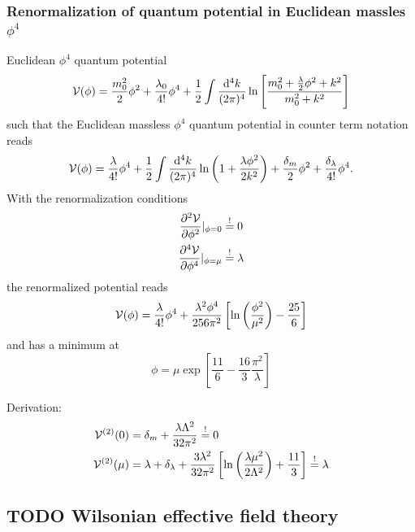 \subsubsection{Renormalization of quantum potential in Euclidean massles $\phi^4$}
\begin{mybox}{}
	Euclidean $\phi^4$ quantum potential
	\begin{equation}
		\mathcal{V}(\phi)=\frac{m^2_0}{2} \phi^2 +\frac{\lambda_0}{4!} \phi^4 + \frac{1}{2} \int \frac{\mathrm{d}^4 k}{(2 \pi)^4} \ln \left[\frac{m^2_0+\frac{\lambda}{2} \phi^2+k^2}{m^2_0+k^2}\right]
	\end{equation}
	such that the Euclidean massless $\phi^4$ quantum potential in counter term notation reads
	\begin{equation}
		\mathcal{V}(\phi) = \frac{\lambda}{4!}\phi^4 + \frac{1}{2} \int \frac{\mathrm{d}^4 k}{(2 \pi)^4} \ln \left(1+\frac{\lambda \phi^2}{2 k^2}\right) +\frac{\delta_m}{2} \phi^2+\frac{\delta_\lambda}{4!}\phi^4.
	\end{equation}
	With the renormalization conditions
	\begin{align}
		\frac{\partial^2 \mathcal{V}}{\partial \phi^2}|_{\phi=0} &\stackrel{!}{=} 0 \\
		\frac{\partial^4 \mathcal{V}}{\partial \phi^4} |_{\phi=\mu} &\stackrel{!}{=} \lambda
	\end{align}
the renormalized potential reads
\begin{equation}
	\mathcal{V}(\phi) = \frac{\lambda}{4!}\phi^4 + \frac{\lambda^2 \phi^4}{256 \pi^2}\left[\ln\left(\frac{\phi^2}{\mu^2}\right)-\frac{25}{6}\right]
\end{equation}
and has a minimum at
\begin{equation}
	\phi = \mu \exp\left[\frac{11}{6} - \frac{16}{3} \frac{\pi^2}{\lambda}\right]
\end{equation}
\end{mybox}
Derivation:
\begin{align*}
	\mathcal{V}^{(2)}(0) &= \delta_m + \frac{\lambda \Lambda^2}{32 \pi^2} \stackrel{!}{=} 0 \\
	\mathcal{V}^{(2)}(\mu) &= \lambda + \delta_{\lambda}+\frac{3\lambda^2}{32 \pi^2}\left[\ln \left(\frac{\lambda \mu^2}{2 \Lambda^2}\right)+\frac{11}{3}\right]\stackrel{!}{=}\lambda
\end{align*}









\subsection{TODO Wilsonian effective field theory}
